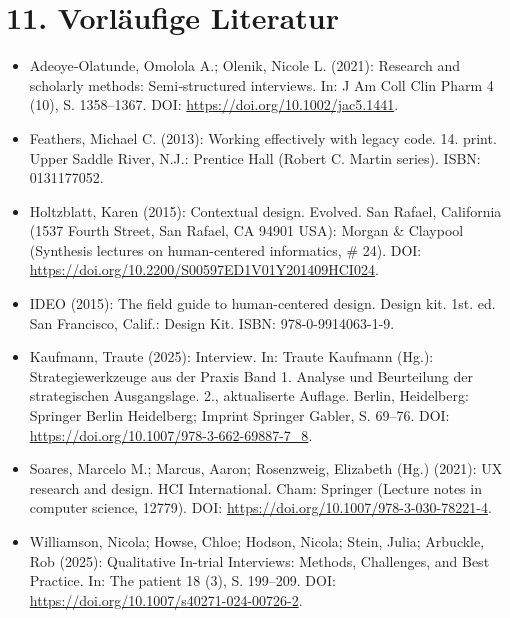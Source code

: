 \section*{11. Vorläufige Literatur}
\begin{itemize}
    \item Adeoye‐Olatunde, Omolola A.; Olenik, Nicole L. (2021): Research and scholarly methods: Semi‐structured interviews. In: J Am Coll Clin Pharm 4 (10), S. 1358–1367. DOI: \url{https://doi.org/10.1002/jac5.1441}.
    
    \item Feathers, Michael C. (2013): Working effectively with legacy code. 14. print. Upper Saddle River, N.J.: Prentice Hall (Robert C. Martin series). ISBN: 0131177052.
    
    \item Holtzblatt, Karen (2015): Contextual design. Evolved. San Rafael, California (1537 Fourth Street, San Rafael, CA 94901 USA): Morgan \& Claypool (Synthesis lectures on human-centered informatics, \# 24). DOI: \url{https://doi.org/10.2200/S00597ED1V01Y201409HCI024}.
    
    \item IDEO (2015): The field guide to human-centered design. Design kit. 1st. ed. San Francisco, Calif.: Design Kit. ISBN: 978-0-9914063-1-9.
    
    \item Kaufmann, Traute (2025): Interview. In: Traute Kaufmann (Hg.): Strategiewerkzeuge aus der Praxis Band 1. Analyse und Beurteilung der strategischen Ausgangslage. 2., aktualiserte Auflage. Berlin, Heidelberg: Springer Berlin Heidelberg; Imprint Springer Gabler, S. 69–76. DOI: \url{https://doi.org/10.1007/978-3-662-69887-7_8}.
    
    \item Soares, Marcelo M.; Marcus, Aaron; Rosenzweig, Elizabeth (Hg.) (2021): UX research and design. HCI International. Cham: Springer (Lecture notes in computer science, 12779). DOI: \url{https://doi.org/10.1007/978-3-030-78221-4}.

    \item Williamson, Nicola; Howse, Chloe; Hodson, Nicola; Stein, Julia; Arbuckle, Rob (2025): Qualitative In-trial Interviews: Methods, Challenges, and Best Practice. In: The patient 18 (3), S. 199–209. DOI: \url{https://doi.org/10.1007/s40271-024-00726-2}.
\end{itemize}
